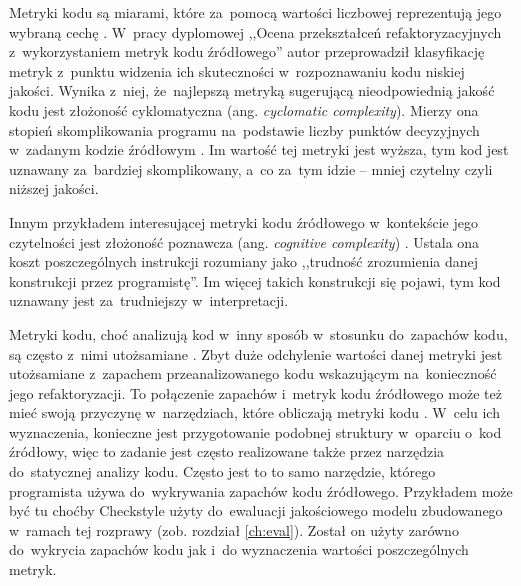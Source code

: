 \documentclass[twoside]{praca}
\begin{document}
Metryki kodu są miarami, które za~pomocą wartości liczbowej reprezentują jego wybraną cechę \cite{barkmann2009quantitative}. W~pracy dyplomowej ,,Ocena przekształceń refaktoryzacyjnych z~wykorzystaniem metryk kodu źródłowego'' \cite{drozdz} autor przeprowadził klasyfikację metryk z~punktu widzenia ich skuteczności w~rozpoznawaniu kodu niskiej jakości. Wynika z~niej, że~najlepszą metryką sugerującą nieodpowiednią jakość kodu jest złożoność cyklomatyczna (ang. \textit{cyclomatic complexity}). Mierzy ona stopień skomplikowania programu na~podstawie liczby punktów decyzyjnych w~zadanym kodzie źródłowym \cite{mccabe1976complexity}. Im wartość tej metryki jest wyższa, tym kod jest uznawany za~bardziej skomplikowany, a~co za~tym idzie -- mniej czytelny czyli niższej jakości.

Innym przykładem interesującej metryki kodu źródłowego w~kontekście jego czytelności jest złożoność poznawcza (ang. \textit{cognitive complexity}) \cite{cognitive}. Ustala ona koszt poszczególnych instrukcji rozumiany jako ,,trudność zrozumienia danej konstrukcji przez programistę''. Im więcej takich konstrukcji się pojawi, tym kod uznawany jest za~trudniejszy w~interpretacji.

Metryki kodu, choć analizują kod w~inny sposób w~stosunku do~zapachów kodu, są często z~nimi utożsamiane \cite{munro2005product}. Zbyt duże odchylenie wartości danej metryki jest utożsamiane z~zapachem przeanalizowanego kodu wskazującym na~konieczność jego refaktoryzacji. To połączenie zapachów i~metryk kodu źródłowego może też mieć swoją przyczynę w~narzędziach, które obliczają metryki kodu \cite{fontana2011experience}. W~celu ich wyznaczenia, konieczne jest przygotowanie podobnej struktury w~oparciu o~kod źródłowy, więc to zadanie jest często realizowane także przez narzędzia do~statycznej analizy kodu. Często jest to to samo narzędzie, którego programista używa do~wykrywania zapachów kodu źródłowego. Przykładem może być tu choćby Checkstyle użyty do~ewaluacji jakościowego modelu zbudowanego w~ramach tej rozprawy (zob. rozdział \ref{ch:eval}). Został on użyty zarówno do~wykrycia zapachów kodu jak i~do wyznaczenia wartości poszczególnych metryk.

\end{document}

